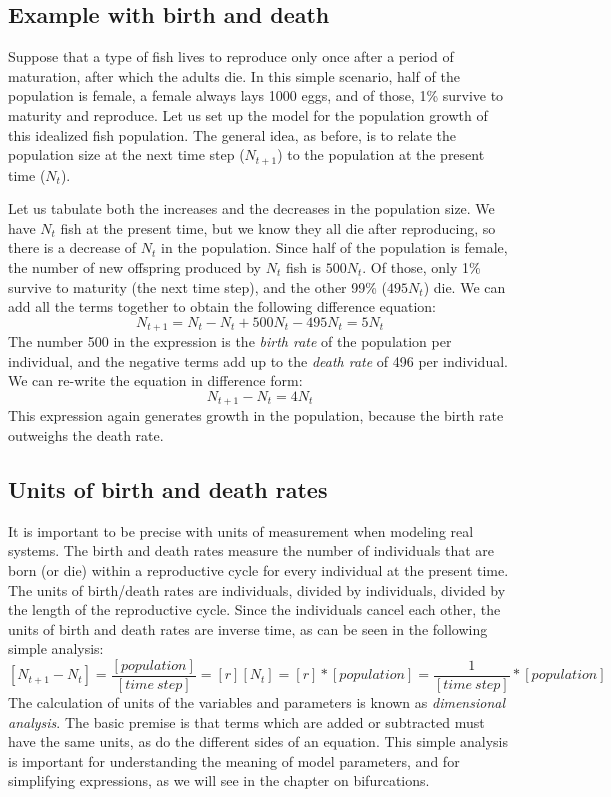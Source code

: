 \documentclass[11pt]{book}
\begin{document}
\subsection{Example with birth and death} Suppose that a type of fish lives to reproduce only once after a period of maturation, after which the adults die. In this simple scenario, half of the population is female, a female always lays 1000 eggs, and of those, 1\% survive to maturity and reproduce. Let us set up the model for the population growth of this idealized fish population. The general idea, as before, is to relate the population size at the next time step ($N_{t+1}$) to the population at the present time ($N_t$).

Let us tabulate both the increases and the decreases in the population size. We have $N_t$ fish at the present time, but we know they all die after reproducing, so there is a decrease of $N_t$ in the population. Since half of the population is female, the number of new offspring produced by $N_t$ fish is $500N_t$. Of those, only 1\% survive to maturity (the next time step), and the other 99\%  ($495N_t$) die. We can add all the terms together to obtain the following difference equation:
$$ N_{t+1} = N_t - N_t + 500N_t - 495 N_t  = 5N_t  $$
The number 500 in the expression is the \emph{birth rate} of the population per individual, and the negative terms add up to the \emph{death rate} of 496 per individual. We can re-write the equation in difference form:
$$ N_{t+1} - N_t = 4N_t$$
This expression again generates growth in the population, because the birth rate outweighs the death rate.

\subsection{Units of birth and death rates}
It is important to be precise with units of measurement when modeling real systems. The birth and death rates measure the number of individuals that are born (or die) within a reproductive cycle for every individual at the present time. The units of birth/death rates are individuals, divided by individuals, divided by the length of the reproductive cycle. Since the individuals cancel each other, the units of birth and death rates are inverse time, as can be seen in the following simple analysis:
$$ [N_{t+1} - N_t] = \frac{[population]}{[time \ step]} = [r] [N_t] = [r] *[population] = \frac{1}{[time \ step] }* [population]$$
The calculation of units of the variables and parameters is known as \emph{dimensional analysis}. The basic premise is that terms which are added or subtracted must have the same units, as do the different sides of an equation. This simple analysis is important for understanding the meaning of model parameters, and for simplifying expressions, as we will see in the chapter on bifurcations.
\end{document}
